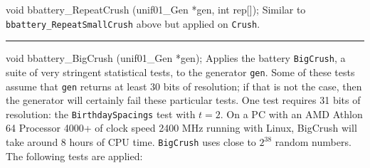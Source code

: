 \code


void bbattery_RepeatCrush (unif01_Gen *gen, int rep[]);
\endcode
  \tab Similar to {\tt bbattery\_RepeatSmallCrush} above but applied on
  {\tt Crush}.
  \endtab
\bigskip

\hrule
\code


void bbattery_BigCrush (unif01_Gen *gen);
\endcode
  \tab
  Applies the battery {\tt BigCrush}, a suite of very stringent statistical
  tests, to the generator {\tt gen}. 
  Some of these tests assume that {\tt gen} returns at least 30 bits of
  resolution; if that is not the case, then the generator will certainly
  fail these particular tests. One test requires 31 bits of resolution:
  the {\tt BirthdaySpacings} test with $t=2$.
  On a PC with an AMD Athlon 64 Processor 4000+
  of clock speed 2400 MHz running with Linux, BigCrush 
  will take around 8 hours of CPU time. {\tt BigCrush} uses close to
  $2^{38}$ random numbers.
  The following tests are applied:\label{bat:BigCrush}
  \endtab


